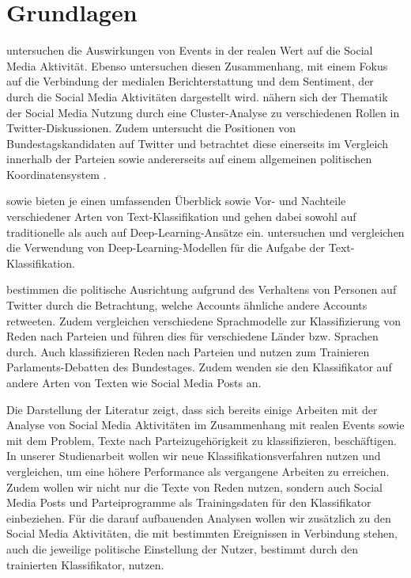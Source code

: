 
\chapter{Grundlagen} \label{ch:materialsAndMethods}

\textcite{kalyanam_prediction_2016} untersuchen die Auswirkungen von Events in der realen Wert auf die Social Media Aktivität. Ebenso untersuchen \textcite{tsytsarau_dynamics_2014} diesen Zusammenhang, mit einem Fokus auf die Verbindung der medialen Berichterstattung und dem Sentiment, der durch die Social Media Aktivitäten dargestellt wird.
\textcite{gimpel_user_2018} nähern sich der Thematik der Social Media Nutzung durch eine Cluster-Analyse zu verschiedenen Rollen in Twitter-Diskussionen.
Zudem untersucht \textcite{saltzer_bundestagswahl_2022} die Positionen von Bundestagskandidaten auf Twitter und betrachtet diese einerseits im Vergleich innerhalb der Parteien sowie andererseits auf einem allgemeinen politischen Koordinatensystem \autocite{saltzer_bundestagswahl_2022, saltzer_finding_2022}.

\textcite{li_survey_2021} sowie \textcite{kowsari_text_2019} bieten je einen umfassenden Überblick sowie Vor- und Nachteile verschiedener Arten von Text-Klassifikation und gehen dabei sowohl auf traditionelle als auch auf Deep-Learning-Ansätze ein.
\textcite{minaee_deep_2022} untersuchen und vergleichen die Verwendung von Deep-Learning-Modellen für die Aufgabe der Text-Klassifikation.

\textcite{wong_quantifying_2016} bestimmen die politische Ausrichtung aufgrund des Verhaltens von Personen auf Twitter durch die Betrachtung, welche Accounts ähnliche andere Accounts retweeten.
Zudem vergleichen \textcite{doan_using_2022} verschiedene Sprachmodelle zur Klassifizierung von Reden nach Parteien und führen dies für verschiedene Länder bzw. Sprachen durch.
Auch \textcite{biessmann_predicting_2016} klassifizieren Reden nach Parteien und nutzen zum Trainieren Parlaments-Debatten des Bundestages. Zudem wenden sie den Klassifikator auf andere Arten von Texten wie Social Media Posts an.

Die Darstellung der Literatur zeigt, dass sich bereits einige Arbeiten mit der Analyse von Social Media Aktivitäten im Zusammenhang mit realen Events sowie mit dem Problem, Texte nach Parteizugehörigkeit zu klassifizieren, beschäftigen.
In unserer Studienarbeit wollen wir neue Klassifikationsverfahren nutzen und vergleichen, um eine höhere Performance als vergangene Arbeiten zu erreichen.
Zudem wollen wir nicht nur die Texte von Reden nutzen, sondern auch Social Media Posts und Parteiprogramme als Trainingsdaten für den Klassifikator einbeziehen.
Für die darauf aufbauenden Analysen wollen wir zusätzlich zu den Social Media Aktivitäten, die mit bestimmten Ereignissen in Verbindung stehen, auch die jeweilige politische Einstellung der Nutzer, bestimmt durch den trainierten Klassifikator, nutzen.

